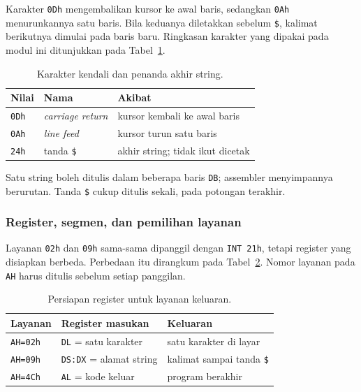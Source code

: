 Karakter \texttt{0Dh} mengembalikan kursor ke awal baris, sedangkan
\texttt{0Ah} menurunkannya satu baris. Bila keduanya diletakkan
sebelum \texttt{\$}, kalimat berikutnya dimulai pada baris baru.
Ringkasan karakter yang dipakai pada modul ini ditunjukkan pada
Tabel~\ref{tab:m01-kontrol}.

\begin{table}[H]
    \centering
    \caption{Karakter kendali dan penanda akhir string.}
    \label{tab:m01-kontrol}
    \small
    \begin{tabular}{@{}lll@{}}
        \toprule
        \textbf{Nilai} & \textbf{Nama} & \textbf{Akibat} \\
        \midrule
        \texttt{0Dh} & \emph{carriage return} &
        kursor kembali ke awal baris \\
        \texttt{0Ah} & \emph{line feed} &
        kursor turun satu baris \\
        \texttt{24h} & tanda \texttt{\$} &
        akhir string; tidak ikut dicetak \\
        \bottomrule
    \end{tabular}
\end{table}

Satu string boleh ditulis dalam beberapa baris \texttt{DB}; assembler
menyimpannya berurutan. Tanda \texttt{\$} cukup ditulis sekali, pada
potongan terakhir.

\subsubsection*{Register, segmen, dan pemilihan layanan}

Layanan \texttt{02h} dan \texttt{09h} sama-sama dipanggil dengan
\texttt{INT 21h}, tetapi register yang disiapkan berbeda. Perbedaan
itu dirangkum pada Tabel~\ref{tab:m01-layanan}. Nomor layanan pada
\texttt{AH} harus ditulis sebelum setiap panggilan.

\begin{table}[H]
    \centering
    \caption{Persiapan register untuk layanan keluaran.}
    \label{tab:m01-layanan}
    \small
    \begin{tabular}{@{}lll@{}}
        \toprule
        \textbf{Layanan} & \textbf{Register masukan} &
        \textbf{Keluaran} \\
        \midrule
        \texttt{AH=02h} & \texttt{DL} = satu karakter &
        satu karakter di layar \\
        \texttt{AH=09h} & \texttt{DS:DX} = alamat string &
        kalimat sampai tanda \texttt{\$} \\
        \texttt{AH=4Ch} & \texttt{AL} = kode keluar &
        program berakhir \\
        \bottomrule
    \end{tabular}
\end{table}

